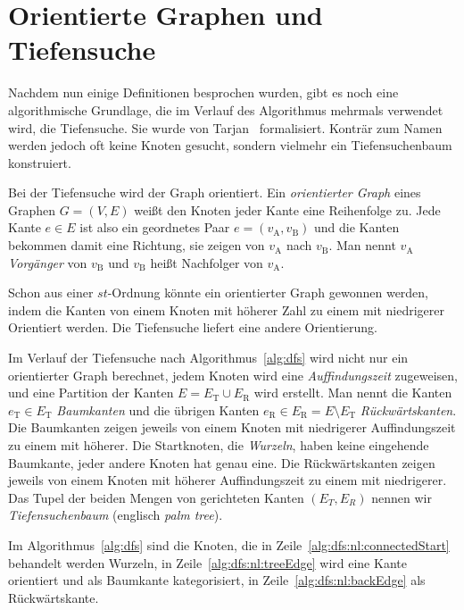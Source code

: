 \documentclass[a4paper]{scrreprt}
\theoremstyle{definition}
\begin{document}
\section{Orientierte Graphen und Tiefensuche}

Nachdem nun einige Definitionen besprochen wurden, gibt es noch eine algorithmische Grundlage, die im Verlauf des Algorithmus mehrmals verwendet wird, die Tiefensuche. Sie wurde von Tarjan~\cite{tarjan-72} formalisiert. Konträr zum Namen werden jedoch oft keine Knoten gesucht, sondern vielmehr ein Tiefensuchenbaum konstruiert.

Bei der Tiefensuche wird der Graph orientiert. Ein \emph{orientierter Graph} eines Graphen $G = (V, E)$ weißt den Knoten jeder Kante eine Reihenfolge zu. Jede Kante $e \in E$ ist also ein geordnetes Paar $e = (v_\text{A}, v_\text{B})$ und die Kanten bekommen damit eine Richtung, sie zeigen von $v_\text{A}$ nach $v_\text{B}$. Man nennt $v_\text{A}$ \emph{Vorgänger} von $v_\text{B}$ und $v_\text{B}$ heißt Nachfolger von $v_\text{A}$. 

Schon aus einer $st$-Ordnung könnte ein orientierter Graph gewonnen werden, indem die Kanten von einem Knoten mit höherer Zahl zu einem mit niedrigerer Orientiert werden. Die Tiefensuche liefert eine andere Orientierung.

Im Verlauf der Tiefensuche nach Algorithmus~\ref{alg:dfs} wird nicht nur ein orientierter Graph berechnet, jedem Knoten wird eine \emph{Auffindungszeit} zugeweisen, und eine Partition der Kanten $E = E_\text{T} \cup E_\text{R}$ wird erstellt. Man nennt die Kanten $e_\text{T} \in E_\text{T}$ \emph{Baumkanten} und die übrigen Kanten $e_\text{R} \in E_\text{R} =  E \setminus E_\text{T}$ \emph{Rückwärtskanten}. Die Baumkanten zeigen jeweils von einem Knoten mit niedrigerer Auffindungszeit zu einem mit höherer. Die Startknoten, die \emph{Wurzeln}, haben keine eingehende Baumkante, jeder andere Knoten hat genau eine. Die Rückwärtskanten zeigen jeweils von einem Knoten mit höherer Auffindungszeit zu einem mit niedrigerer. Das Tupel der beiden Mengen von gerichteten Kanten $(E_T, E_R)$ nennen wir \emph{Tiefensuchenbaum} (englisch \emph{palm tree}).

Im Algorithmus~\ref{alg:dfs} sind die Knoten, die in Zeile~\ref{alg:dfs:nl:connectedStart} behandelt werden Wurzeln, in Zeile~\ref{alg:dfs:nl:treeEdge} wird eine Kante orientiert und als Baumkante kategorisiert, in Zeile~\ref{alg:dfs:nl:backEdge} als Rückwärtskante.
\end{document}
